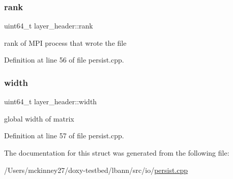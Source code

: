 \subsubsection{\texorpdfstring{rank}{rank}}
{\footnotesize\ttfamily uint64\+\_\+t layer\+\_\+header\+::rank}

rank of M\+PI process that wrote the file 

Definition at line 56 of file persist.\+cpp.

\mbox{\label{structlayer__header_af1f45c9c74db048ea424114418f22d50}} 
\subsubsection{\texorpdfstring{width}{width}}
{\footnotesize\ttfamily uint64\+\_\+t layer\+\_\+header\+::width}

global width of matrix 

Definition at line 57 of file persist.\+cpp.



The documentation for this struct was generated from the following file\+:\begin{DoxyCompactItemize}
\item 
/\+Users/mckinney27/doxy-\/testbed/lbann/src/io/\hyperlink{persist_8cpp}{persist.\+cpp}\end{DoxyCompactItemize}
